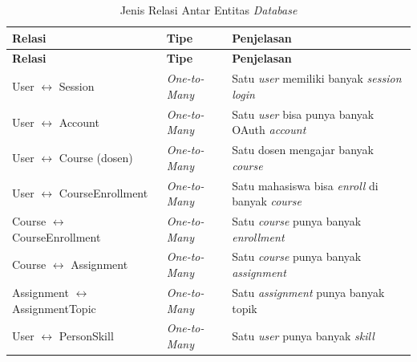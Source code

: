 \begin{longtable}{|p{}|p{}|p{}|}
	\caption{Jenis Relasi Antar Entitas \textit{Database}}
	\label{tab:3.relasi-database}                                                                                                                                           \\
	\hline
	\textbf{Relasi}                                          & \textbf{Tipe}                         & \textbf{Penjelasan}                                                  \\
	\hline
	\endfirsthead
	\hline
	\textbf{Relasi}                                          & \textbf{Tipe}                         & \textbf{Penjelasan}                                                  \\
	\hline
	\endhead
	\hline
	\endfoot
	\hline
	\endlastfoot
	User $\leftrightarrow$ Session                           & \textit{One-to-Many}                  & Satu \textit{user} memiliki banyak \textit{session login}            \\
	\hline
	User $\leftrightarrow$ Account                           & \textit{One-to-Many}                  & Satu \textit{user} bisa punya banyak OAuth \textit{account}          \\
	\hline
	User $\leftrightarrow$ Course (dosen)                    & \textit{One-to-Many}                  & Satu dosen mengajar banyak \textit{course}                           \\
	\hline
	User $\leftrightarrow$ CourseEnrollment                  & \textit{One-to-Many}                  & Satu mahasiswa bisa \textit{enroll} di banyak \textit{course}        \\
	\hline
	Course $\leftrightarrow$ CourseEnrollment                & \textit{One-to-Many}                  & Satu \textit{course} punya banyak \textit{enrollment}                \\
	\hline
	Course $\leftrightarrow$ Assignment                      & \textit{One-to-Many}                  & Satu \textit{course} punya banyak \textit{assignment}                \\
	\hline
	Assignment $\leftrightarrow$ AssignmentTopic             & \textit{One-to-Many}                  & Satu \textit{assignment} punya banyak topik                          \\
	\hline
	User $\leftrightarrow$ PersonSkill                       & \textit{One-to-Many}                  & Satu \textit{user} punya banyak \textit{skill}                       \\

\end{longtable}
